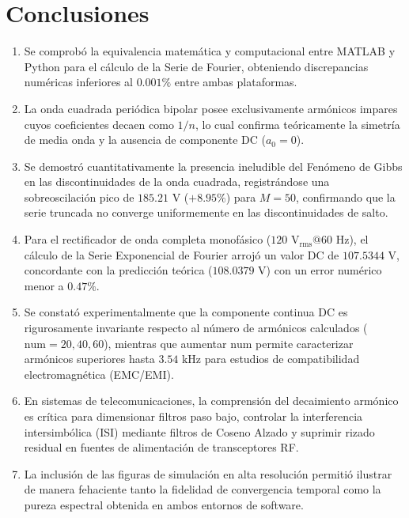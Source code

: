 \documentclass[11pt,a4paper]{article}
\begin{document}
\section{Conclusiones}
\begin{enumerate}[leftmargin=*]
    \item Se comprobó la equivalencia matemática y computacional entre MATLAB y Python para el cálculo de la Serie de Fourier, obteniendo discrepancias numéricas inferiores al $0.001\%$ entre ambas plataformas.
    \item La onda cuadrada periódica bipolar posee exclusivamente armónicos impares cuyos coeficientes decaen como $1/n$, lo cual confirma teóricamente la simetría de media onda y la ausencia de componente DC ($a_0 = 0$).
    \item Se demostró cuantitativamente la presencia ineludible del Fenómeno de Gibbs en las discontinuidades de la onda cuadrada, registrándose una sobreoscilación pico de $185.21\text{ V}$ ($+8.95\%$) para $M = 50$, confirmando que la serie truncada no converge uniformemente en las discontinuidades de salto.
    \item Para el rectificador de onda completa monofásico ($120\text{ V}_{\text{rms}} @ 60\text{ Hz}$), el cálculo de la Serie Exponencial de Fourier arrojó un valor DC de $107.5344\text{ V}$, concordante con la predicción teórica ($108.0379\text{ V}$) con un error numérico menor a $0.47\%$.
    \item Se constató experimentalmente que la componente continua DC es rigurosamente invariante respecto al número de armónicos calculados ($\text{num} = 20, 40, 60$), mientras que aumentar $\text{num}$ permite caracterizar armónicos superiores hasta $3.54\text{ kHz}$ para estudios de compatibilidad electromagnética (EMC/EMI).
    \item En sistemas de telecomunicaciones, la comprensión del decaimiento armónico es crítica para dimensionar filtros paso bajo, controlar la interferencia intersimbólica (ISI) mediante filtros de Coseno Alzado y suprimir rizado residual en fuentes de alimentación de transceptores RF.
    \item La inclusión de las figuras de simulación en alta resolución permitió ilustrar de manera fehaciente tanto la fidelidad de convergencia temporal como la pureza espectral obtenida en ambos entornos de software.
\end{enumerate}
\end{document}
